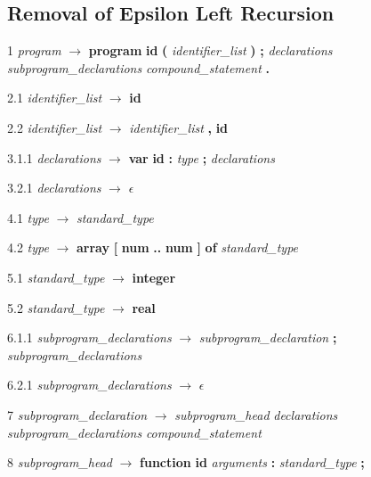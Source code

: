 
% 
\subsection*{Removal of Epsilon Left Recursion}
1    \emph{program} $\rightarrow$ \textbf{program} \textbf{id} \textbf{(} \emph{identifier\_list} \textbf{)} \textbf{;} \emph{declarations} \emph{subprogram\_declarations} \emph{compound\_statement} \textbf{.}


2.1  \emph{identifier\_list} $\rightarrow$ \textbf{id}

2.2  \emph{identifier\_list} $\rightarrow$ \emph{identifier\_list} \textbf{,} \textbf{id}

3.1.1  \emph{declarations} $\rightarrow$ \textbf{var} \textbf{id} \textbf{:} \emph{type} \textbf{;} \emph{declarations}

3.2.1  \emph{declarations} $\rightarrow$ $\epsilon$

4.1  \emph{type} $\rightarrow$ \emph{standard\_type}

4.2  \emph{type} $\rightarrow$ \textbf{array} \textbf{[} \textbf{num} \textbf{..} \textbf{num} \textbf{]} \textbf{of} \emph{standard\_type}

5.1  \emph{standard\_type} $\rightarrow$ \textbf{integer}

5.2  \emph{standard\_type} $\rightarrow$ \textbf{real}

6.1.1  \emph{subprogram\_declarations} $\rightarrow$ \emph{subprogram\_declaration} \textbf{;} \emph{subprogram\_declarations}

6.2.1  \emph{subprogram\_declarations} $\rightarrow$ $\epsilon$

7    \emph{subprogram\_declaration} $\rightarrow$ \emph{subprogram\_head} \emph{declarations} \emph{subprogram\_declarations} \emph{compound\_statement}

8    \emph{subprogram\_head} $\rightarrow$ \textbf{function} \textbf{id} \emph{arguments} \textbf{:} \emph{standard\_type} \textbf{;}

